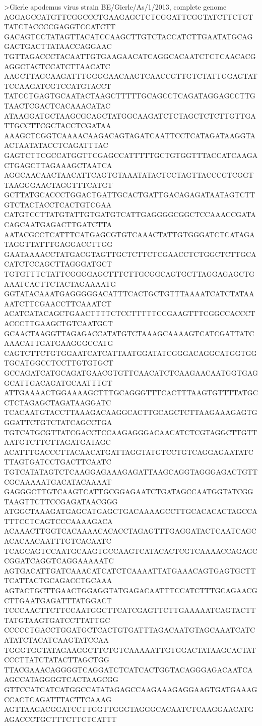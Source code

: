 >Gierle apodemus virus strain BE/Gierle/As/1/2013, complete genome
AGGAGCCATGTTCGGCCCTGAAGAGCTCTCGGATTCGGTATCTTCTGTTATCTACCCCGAGGTCCATCTT
GACAGTCCTATAGTTACATCCAAGCTTGTCTACCATCTTGAATATGCAGGACTGACTTATAACCAGGAAC
TGTTAGACCCTACAATTGTGAAGAACATCAGGCACAATCTCTCAACACGAGGCTACTCCATCTTAACATC
AAGCTTAGCAAGATTTGGGGAACAAGTCAACCGTTGTCTATTGGAGTATTCCAAGATCGTCCATGTACCT
TATCCTGAGTGCAATACTAAGCTTTTTGCAGCCTCAGATAGGAGCCTTGTAACTCGACTCACAAACATAC
ATAAGGATGCTAAGCGCAGCTATGGCAAGATCTCTAGCTCTCTTGTTGATTGCCTTCGCTACCTCGATAA
AAAGCTCGGTCAAAACAAGACAGTAGATCAATTCCTCATAGATAAGGTAACTAATATACCTCAGATTTAC
GAGTCTTCGCCATGGTTCGAGCCATTTTTGCTGTGGTTTACCATCAAGACTGAGCTTAGAAAGCTAATCA
AGGCAACAACTAACATTCAGTGTAAATATACTCCTAGTTACCCGTCGGTTAAGGGAACTAGGTTTCATGT
GCTTATGCACCCTGGACTGATTGCACTGATTGACAGAGATAATAGTCTTGTCTACTACCTCACTGTCGAA
CATGTCCTTATGTATTGTGATGTCATTGAGGGGCGGCTCCAAACCGATACAGCAATGAGACTTGATCTTA
AATACGCCTCATTTCATGAGCGTGTCAAACTATTGTGGGATCTCATAGATAGGTTATTTGAGGACCTTGG
GAATAAAACCTATGACGTAGTTGCTCTTCTCGAACCTCTGGCTCTTGCACATCTCCAGCTTAGGGATGCT
TGTGTTTCTATTCGGGGAGCTTTCTTGCGGCAGTGCTTAGGAGAGCTGAAATCACTTCTACTAGAAAATG
GGTATACAAATGAGGGGGACATTTCACTGCTGTTTAAAATCATCTATAAAATCTTCGAACCTTCAAATCT
ACATCATACAGCTGAACTTTTCTCCTTTTTCCGAAGTTTCGGCCACCCTACCCTTGAAGCTGTCAATGCT
GCAACTAAGGTTAGAGACCATATGTCTAAAGCAAAAGTCATCGATTATCAAACATTGATGAAGGGCCATG
CAGTCTTCTGTGGAATCATCATTAATGGATATCGGGACAGGCATGGTGGTGCATGGCCTCCTTGTGTGCT
GCCAGATCATGCAGATGAACGTGTTCAACATCTCAAGAACAATGGTGAGGCATTGACAGATGCAATTTGT
ATTGAAAACTGGAAAAGCTTTGCAGGGTTTCACTTTAAGTGTTTTATGCCTCTAGAGCTAGATAAGGATC
TCACAATGTACCTTAAAGACAAGGCACTTGCAGCTCTTAAGAAAGAGTGGGATTCTGTCTATCAGCCTGA
TGTCATGCGTTATCGACCTCCAAGAGGGACAACATCTCGTAGGCTTGTTAATGTCTTCTTAGATGATAGC
ACATTTGACCCTTACAACATGATTAGGTATGTCCTGTCAGGAGAATATCTTAGTGATCCTGACTTCAATC
TGTCATATAGTCTCAAGGAGAAAGAGATTAAGCAGGTAGGGAGACTGTTCGCAAAAATGACATACAAAAT
GAGGGCTTGTCAAGTCATTGCGGAGAATCTGATAGCCAATGGTATCGGTAAGTTCTTCCGAGATAACGGG
ATGGCTAAAGATGAGCATGAGCTGACAAAAGCCTTGCACACACTAGCCATTTCCTCAGTCCCAAAAGACA
ACAAACTTGGTCACAAAACACACCTAGAGTTTGAGGATACTCAATCAGCACACAACAATTTGTCACAATC
TCAGCAGTCCAATGCAAGTGCCAAGTCATACACTCGTCAAAACCAGAGCCGGATCAGGTCAGGAAAAATC
AGTGACATTGATCAAACATCATCTCAAAATTATGAAACAGTGAGTGCTTTCATTACTGCAGACCTGCAAA
AGTACTGCTTGAACTGGAGGTATGAGACAATTTCCATCTTTGCAGAACGCTTGAATGAGATTTATGGACT
TCCCAACTTCTTCCAATGGCTTCATCGAGTTCTTGAAAAATCAGTACTTTATGTAAGTGATCCTTATTGC
CCCCCTGACCTGGATGCTCACTGTGATTTAGACAATGTAGCAAATCATCATATCTACATCAAGTATCCAA
TGGGTGGTATAGAAGGCTTCTGTCAAAAATTGTGGACTATAAGCACTATCCCTTATCTATACTTAGCTGG
TTACGAAACAGGGGTCAGGATCTCATCACTGGTACAGGGAGACAATCAAGCCATAGGGGTCACTAAGCGG
GTTCCATCATCATGGCCATATAGAGCCAAGAAAGAGGAAGTGATGAAAGCCACTCAGATTTACTTCAAAG
AGTTAAGACGGATCCTTGGTTGGGTAGGGCACAATCTCAAGGAACATGAGACCCTGCTTTCTTCTCATTT
